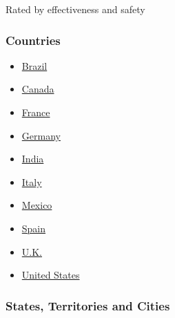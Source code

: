 Rated by effectiveness and safety

\hypertarget{countries}{%
\subsubsection{Countries}\label{countries}}

\begin{itemize}
\tightlist
\item
  \href{https://www.nytimes3xbfgragh.onion/interactive/2020/world/americas/brazil-coronavirus-cases.html}{Brazil}
\item
  \href{https://www.nytimes3xbfgragh.onion/interactive/2020/world/canada/canada-coronavirus-cases.html}{Canada}
\item
  \href{https://www.nytimes3xbfgragh.onion/interactive/2020/world/europe/france-coronavirus-cases.html}{France}
\item
  \href{https://www.nytimes3xbfgragh.onion/interactive/2020/world/europe/germany-coronavirus-cases.html}{Germany}
\item
  \href{https://www.nytimes3xbfgragh.onion/interactive/2020/world/asia/india-coronavirus-cases.html}{India}
\item
  \href{https://www.nytimes3xbfgragh.onion/interactive/2020/world/europe/italy-coronavirus-cases.html}{Italy}
\item
  \href{https://www.nytimes3xbfgragh.onion/interactive/2020/world/americas/mexico-coronavirus-cases.html}{Mexico}
\item
  \href{https://www.nytimes3xbfgragh.onion/interactive/2020/world/europe/spain-coronavirus-cases.html}{Spain}
\item
  \href{https://www.nytimes3xbfgragh.onion/interactive/2020/world/europe/united-kingdom-coronavirus-cases.html}{U.K.}
\item
  \href{https://www.nytimes3xbfgragh.onion/interactive/2020/us/coronavirus-us-cases.html}{United
  States}
\end{itemize}

\hypertarget{states-territories-and-cities}{%
\subsubsection{States, Territories and
Cities}\label{states-territories-and-cities}}

